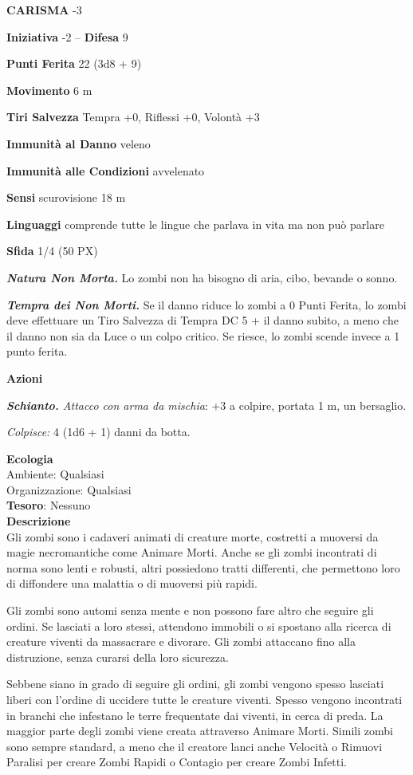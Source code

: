 \begin{multicols}{2}
\textbf{CARISMA} -3

\textbf{Iniziativa} -2 -- \textbf{Difesa} 9

\textbf{Punti Ferita} 22 (3d8 + 9)

\textbf{Movimento} 6 m

\textbf{Tiri Salvezza} Tempra +0, Riflessi +0, Volontà +3

\textbf{Immunità al Danno} veleno

\textbf{Immunità alle Condizioni} avvelenato

\textbf{Sensi} scurovisione 18 m

\textbf{Linguaggi} comprende tutte le lingue che parlava in vita ma non può parlare

\textbf{Sfida} 1/4 (50 PX)

\textit{\textbf{Natura Non Morta.}} Lo zombi non ha bisogno di aria, cibo, bevande o sonno.

\textit{\textbf{Tempra dei Non Morti.}} Se il danno riduce lo zombi a 0 Punti Ferita, lo zombi deve effettuare un Tiro Salvezza di Tempra DC 5 + il danno subito, a meno che il danno non sia da Luce o un colpo critico. Se riesce, lo zombi scende invece a 1 punto ferita.

\textbf{Azioni}

\textit{\textbf{Schianto.} Attacco con arma da mischia}: +3 a colpire, portata 1 m, un bersaglio.

\textit{Colpisce:} 4 (1d6 + 1) danni da botta.

\textbf{Ecologia}\\
Ambiente: Qualsiasi\\
Organizzazione: Qualsiasi\\
\textbf{Tesoro}: Nessuno\\
\textbf{Descrizione}\\
Gli zombi sono i cadaveri animati di creature morte, costretti a muoversi da magie necromantiche come Animare Morti. Anche se gli zombi incontrati di norma sono lenti e robusti, altri possiedono tratti differenti, che permettono loro di diffondere una malattia o di muoversi più rapidi.

Gli zombi sono automi senza mente e non possono fare altro che seguire gli ordini. Se lasciati a loro stessi, attendono immobili o si spostano alla ricerca di creature viventi da massacrare e divorare. Gli zombi attaccano fino alla distruzione, senza curarsi della loro sicurezza.

Sebbene siano in grado di seguire gli ordini, gli zombi vengono spesso lasciati liberi con l'ordine di uccidere tutte le creature viventi. Spesso vengono incontrati in branchi che infestano le terre frequentate dai viventi, in cerca di preda. La maggior parte degli zombi viene creata attraverso Animare Morti. Simili zombi sono sempre standard, a meno che il creatore lanci anche Velocità o Rimuovi Paralisi per creare Zombi Rapidi o Contagio per creare Zombi Infetti.



\end{multicols}
